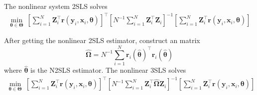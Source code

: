 \documentclass[11pt]{article}
\numberwithin{figure}{section}
\theoremstyle{definition}
\newcommand{\0}{\mathbf{0}}
\newcommand{\bmZ}{\bm{Z}}
\newcommand{\bmr}{\bm{r}}
\newcommand{\bmx}{\bm{x}}
\newcommand{\bmy}{\bm{y}}
\begin{document}
The nonlinear system 2SLS solves
\begin{align}
    \min_{\bm{\theta} \in \bm{\Theta}} \ \left[\sum_{i=1}^N \bmZ_i^\top \bmr(\bmy_i, \bmx_i, \bm{\theta}) \right]^\top \left[N^{-1}\sum_{i=1}^N \bmZ_i^\top \bmZ_i \right]^{-1} \left[\sum_{i=1}^N \bmZ_i^\top \bmr(\bmy_i, \bmx_i, \bm{\theta}) \right]
\end{align}

After getting the nonlinear 2SLS estimator, construct an matrix 
\[\hat{\bm{\Omega}} = N^{-1}\sum_{i=1}^N \bmr_i(\hat{\bm{\theta}})^\top \bmr_i(\hat{\bm{\theta}})\]
where $\hat{\bm{\theta}}$ is the N2SLS estimator.
The nonlinear 3SLS solves
\begin{align}
    \min_{\bm{\theta} \in \bm{\Theta}} \ \left[\sum_{i=1}^N \bmZ_i^\top \bmr(\bmy_i, \bmx_i, \bm{\theta}) \right]^\top \left[N^{-1}\sum_{i=1}^N \bmZ_i^\top \hat{\bm{\Omega}}\bmZ_i \right]^{-1} \left[\sum_{i=1}^N \bmZ_i^\top \bmr(\bmy_i, \bmx_i, \bm{\theta}) \right]
\end{align}






\end{document}
